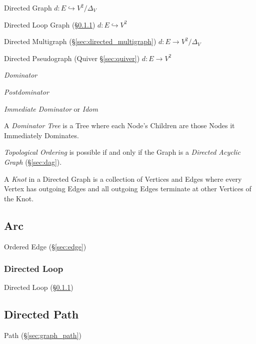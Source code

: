 Directed Graph
$d : E \hookrightarrow V^2 / \Delta_V$

Directed Loop Graph (\S\ref{sec:directed_loop}) $d : E \hookrightarrow
V^2$

Directed Multigraph (\S\ref{sec:directed_multigraph}) $d : E
\rightarrow V^2 / \Delta_V$

Directed Pseudograph (Quiver \S\ref{sec:quiver}) $d : E \rightarrow
V^2$



\emph{Dominator}

\emph{Postdominator}

\emph{Immediate Dominator} or \emph{Idom}

A \emph{Dominator Tree} is a Tree where each Node's Children are those
Nodes it Immediately Dominates.

\emph{Topological Ordering} is possible if and only if the Graph is a
\emph{Directed Acyclic Graph} (\S\ref{sec:dag}).

A \emph{Knot} in a Directed Graph is a collection of Vertices and
Edges where every Vertex has outgoing Edges and all outgoing Edges
terminate at other Vertices of the Knot.



\subsection{Arc}\label{sec:arc}

Ordered Edge (\S\ref{sec:edge})



\subsubsection{Directed Loop}\label{sec:directed_loop}

Directed Loop (\S\ref{sec:directed_loop})



\subsection{Directed Path}\label{sec:directed_path}

Path (\S\ref{sec:graph_path})



